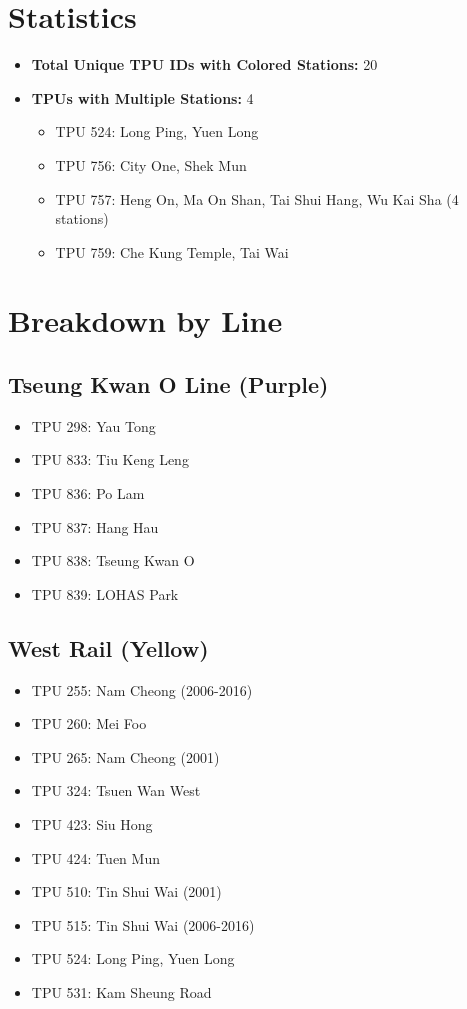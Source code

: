 \documentclass{article}
\begin{document}
\section{Statistics}

\begin{itemize}
    \item \textbf{Total Unique TPU IDs with Colored Stations:} 20
    \item \textbf{TPUs with Multiple Stations:} 4
    \begin{itemize}
        \item TPU 524: Long Ping, Yuen Long
        \item TPU 756: City One, Shek Mun
        \item TPU 757: Heng On, Ma On Shan, Tai Shui Hang, Wu Kai Sha (4 stations)
        \item TPU 759: Che Kung Temple, Tai Wai
    \end{itemize}
\end{itemize}

\section{Breakdown by Line}

\subsection{Tseung Kwan O Line (Purple)}
\begin{itemize}
    \item TPU 298: Yau Tong
    \item TPU 833: Tiu Keng Leng
    \item TPU 836: Po Lam
    \item TPU 837: Hang Hau
    \item TPU 838: Tseung Kwan O
    \item TPU 839: LOHAS Park
\end{itemize}

\subsection{West Rail (Yellow)}
\begin{itemize}
    \item TPU 255: Nam Cheong (2006-2016)
    \item TPU 260: Mei Foo
    \item TPU 265: Nam Cheong (2001)
    \item TPU 324: Tsuen Wan West
    \item TPU 423: Siu Hong
    \item TPU 424: Tuen Mun
    \item TPU 510: Tin Shui Wai (2001)
    \item TPU 515: Tin Shui Wai (2006-2016)
    \item TPU 524: Long Ping, Yuen Long
    \item TPU 531: Kam Sheung Road
\end{itemize}
\end{document}
